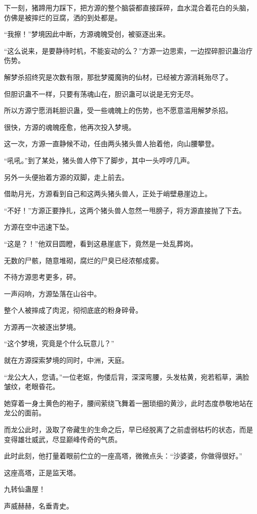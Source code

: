 \begin{this_body}
下一刻，猪蹄用力踩下，把方源的整个脑袋都直接踩碎，血水混合着花白的头脑，仿佛是被摔烂的豆腐，洒的到处都是。

“我擦！”梦境因此中断，方源魂魄受创，被驱逐出来。

“这么说来，是要静待时机，不能妄动的么？”方源一边思索，一边捏碎胆识蛊治疗伤势。

解梦杀招终究是次数有限，那批梦魇魔驹的仙材，已经被方源消耗殆尽了。

但胆识蛊不一样，只要有荡魂山在，胆识蛊可以说是无穷无尽。

所以方源宁愿消耗胆识蛊，受一些魂魄上的伤势，也不愿意滥用解梦杀招。

很快，方源的魂魄痊愈，他再次投入梦境。

这一次，方源一直静候不动，任由两头猪头兽人抬着他，向山腰攀登。

“吼吼。”到了某处，猪头兽人停下了脚步，其中一头哼哼几声。

另外一头便抬着方源的双脚，走上前去。

借助月光，方源看到自己和这两头猪头兽人，正处于峭壁悬崖边上。

“不好！”方源正要挣扎，这两个猪头兽人忽然一甩膀子，将方源直接抛了下去。

方源在空中迅速下坠。

“这是？！”他双目圆瞪，看到这悬崖底下，竟然是一处乱葬岗。

无数的尸骸，随意堆砌，腐烂的尸臭已经浓郁成雾。

不待方源思考更多，砰。

一声闷响，方源坠落在山谷中。

整个人被摔成了肉泥，彻彻底底的粉身碎骨。

方源再一次被逐出梦境。

“这个梦境，究竟是个什么玩意儿？”

就在方源探索梦境的同时，中洲，天庭。

“龙公大人，您请。”一位老妪，佝偻后背，深深弯腰，头发枯黄，宛若稻草，满脸皱纹，老眼昏花。

她穿着一身土黄色的袍子，腰间萦绕飞舞着一圈琐细的黄沙，此时态度恭敬地站在龙公的面前。

而龙公此时，汲取了帝藏生的生命之后，早已经脱离了之前虚弱枯朽的状态，而是变得雄壮威武，尽显巅峰传奇的气质。

此时此刻，他打量着眼前伫立的一座高塔，微微点头：“沙婆婆，你做得很好。”

这座高塔，正是监天塔。

九转仙蛊屋！

声威赫赫，名垂青史。


\end{this_body}
